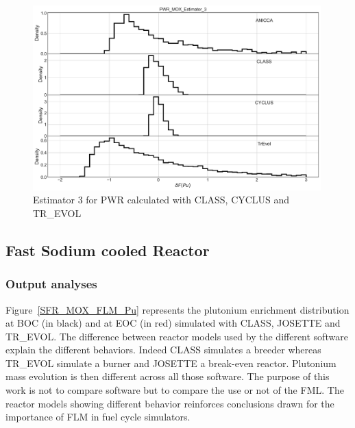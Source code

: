 \begin{figure}[h]
	\begin{center}
		\includegraphics[width = 0.99\textwidth]{../../Feature_1/RAW_DATA/FIG/PWR_MOX_Estimator_3.pdf}
		\caption{Estimator 3 for \gls{PWR} calculated with CLASS, CYCLUS and TR\_EVOL}
		\label{fig:Est3_PWR}
	\end{center}
\end{figure}

\subsection{Fast Sodium cooled Reactor}
\subsubsection{Output analyses}

Figure~\ref{SFR_MOX_FLM_Pu} represents the plutonium enrichment distribution at
BOC (in black) and at \gls{EOC} (in red) simulated with CLASS, JOSETTE and TR\_EVOL.
The difference between reactor models used by the different software explain the
different behaviors. Indeed CLASS simulates a breeder whereas TR\_EVOL simulate a
burner and JOSETTE a break-even reactor. Plutonium mass evolution is then
different across all those software. The purpose of this work is not to compare
software but to compare the use or not of the \gls{FML}. The reactor models
showing different behavior reinforces conclusions drawn for the importance of
\gls{FLM} in fuel cycle simulators.     


